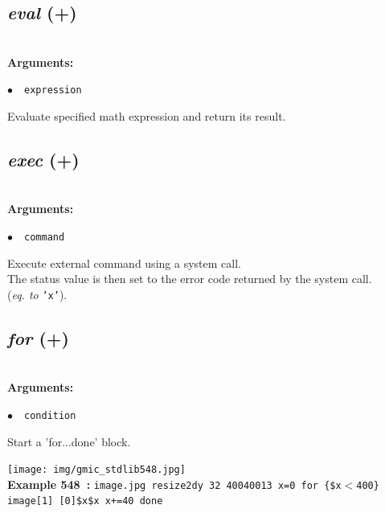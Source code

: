 \documentclass[a4paper,10.5pt,twoside]{book}
\def\comma{\discretionary{,}{}{,}}
\newcommand{\Cb}[1]{\textcolor{cb}{#1}}
\begin{document}
\subsection{\emph{eval} (+)}\vspace*{-0.7em}
~\\\textbf{\Cb{Arguments: }}\begin{flushleft}
{\small \Cb{\hspace*{0.5cm}$\bullet$~~\texttt{expression}}}\end{flushleft}
Evaluate specified math expression and return its result.


\subsection{\emph{exec} (+)}\vspace*{-0.7em}
~\\\textbf{\Cb{Arguments: }}\begin{flushleft}
{\small \Cb{\hspace*{0.5cm}$\bullet$~~\texttt{command}}}\end{flushleft}
Execute external command using a system call.
~\\The status value is then set to the error code returned by the system call.
~\\(\emph{eq. to} {\small \texttt{'x'}}).


\subsection{\emph{for} (+)}\vspace*{-0.7em}
~\\\textbf{\Cb{Arguments: }}\begin{flushleft}
{\small \Cb{\hspace*{0.5cm}$\bullet$~~\texttt{condition}}}\end{flushleft}
Start a 'for...done' block.
\begin{center}\texttt{[image: img/gmic\_stdlib548.jpg]}\\
{\footnotesize \textbf{Example 548~:} \texttt{image.jpg resize2dy 32 400{\comma}400{\comma}1{\comma}3 x=0 for \{\$x$<$400\} image[1] [0]{\comma}\$x{\comma}\$x x+=40 done}}
\end{center}
\end{document}
